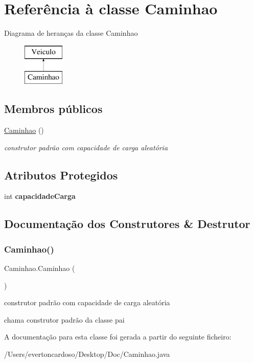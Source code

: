 \hypertarget{class_caminhao}{}\section{Referência à classe Caminhao}
\label{class_caminhao}
Diagrama de heranças da classe Caminhao\begin{figure}[H]
\begin{center}
\leavevmode
\includegraphics[height=2.000000cm]{class_caminhao}
\end{center}
\end{figure}
\subsection*{Membros públicos}
\begin{DoxyCompactItemize}
\item 
\mbox{\hyperlink{class_caminhao_af533c39b3db0b14e7c404d4d91a88e47}{Caminhao}} ()
\begin{DoxyCompactList}\small\item\em construtor padrão com capacidade de carga aleatória \end{DoxyCompactList}\end{DoxyCompactItemize}
\subsection*{Atributos Protegidos}
\begin{DoxyCompactItemize}
\item 
\mbox{\label{class_caminhao_a32551c3ccafebc3d06ecb130e6c7cbb5}} 
int {\bfseries capacidade\+Carga}
\end{DoxyCompactItemize}


\subsection{Documentação dos Construtores \& Destrutor}
\mbox{\label{class_caminhao_af533c39b3db0b14e7c404d4d91a88e47}} 
\subsubsection{\texorpdfstring{Caminhao()}{Caminhao()}}
{\footnotesize\ttfamily Caminhao.\+Caminhao (\begin{DoxyParamCaption}{ }\end{DoxyParamCaption})}



construtor padrão com capacidade de carga aleatória 

chama construtor padrão da classe pai 

A documentação para esta classe foi gerada a partir do seguinte ficheiro\+:\begin{DoxyCompactItemize}
\item 
/\+Users/evertoncardoso/\+Desktop/\+Doc/Caminhao.\+java\end{DoxyCompactItemize}
